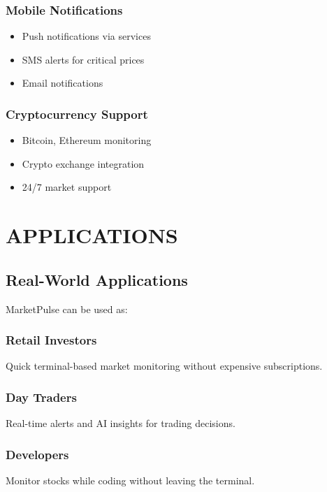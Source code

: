 \documentclass[12pt,a4paper]{article}
\begin{document}
\subsubsection{Mobile Notifications}
\begin{itemize}[itemsep=0.3em]
    \item Push notifications via services
    \item SMS alerts for critical prices
    \item Email notifications
\end{itemize}

\subsubsection{Cryptocurrency Support}
\begin{itemize}[itemsep=0.3em]
    \item Bitcoin, Ethereum monitoring
    \item Crypto exchange integration
    \item 24/7 market support
\end{itemize}

\newpage

\section{APPLICATIONS}

\subsection{Real-World Applications}

MarketPulse can be used as:

\subsubsection{Retail Investors}
Quick terminal-based market monitoring without expensive subscriptions.

\subsubsection{Day Traders}
Real-time alerts and AI insights for trading decisions.

\subsubsection{Developers}
Monitor stocks while coding without leaving the terminal.
\end{document}
